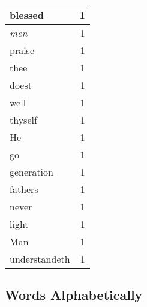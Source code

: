\begin{center}
\begin{longtable}{l|r}
blessed & 1 \\ \hline
\emph{men} & 1 \\ \hline
praise & 1 \\ \hline
thee & 1 \\ \hline
doest & 1 \\ \hline
well & 1 \\ \hline
thyself & 1 \\ \hline
He & 1 \\ \hline
go & 1 \\ \hline
generation & 1 \\ \hline
fathers & 1 \\ \hline
never & 1 \\ \hline
light & 1 \\ \hline
Man & 1 \\ \hline
understandeth & 1 \\ \hline
\end{longtable}
\end{center}



\normalsize



\subsection{Words Alphabetically}

